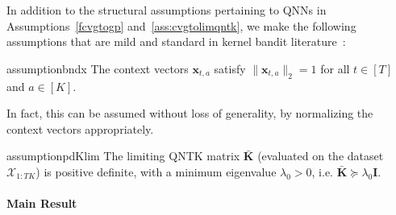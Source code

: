 \documentclass[pdflatex,sn-mathphys-num]{sn-jnl}%
\theoremstyle{thmstyleone}%
\theoremstyle{thmstyletwo}%
\theoremstyle{thmstylethree}%
\newcommand{\xbf}{\mathbf{x}}
\newcommand{\Kbf}{\mathbf{K}}
\newcommand{\Ibf}{\mathbf{I}}
\begin{document}



In addition to the  structural assumptions pertaining to  QNNs in Assumptions~\ref{fcvgtogp} and~\ref{ass:cvgtolimqntk},  
we make the following assumptions that are mild and standard in kernel bandit literature~\cite{cao2019,neuralucb}: 
\begin{restatable}{assumption}{bndx} \label{ass1}
The context vectors $\xbf_{t,a}$ satisfy $\|\xbf_{t,a}\|_2 = 1$ for all $t \in [T]$ and $a \in [K]$.
\end{restatable}
In fact, this can be assumed without loss of generality, by  normalizing the context vectors appropriately.
\begin{restatable}{assumption}{pdKlim}\label{ass2}
    The limiting QNTK matrix $\bar{\Kbf}$ (evaluated on the dataset $\mathcal{X}_{1:TK}$) is   positive definite, with a minimum eigenvalue $\lambda_0 > 0$, i.e. $\bar{\Kbf} \succeq \lambda_0 \Ibf$.
\end{restatable}






\paragraph{Main Result}
\end{document}
